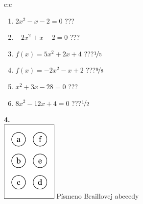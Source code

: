 \documentclass[10pt]{report}
\begin{document}
\begin{tabular}{c:c}
\begin{minipage}[c][104.5mm][t]{0.5\linewidth}
\begin{center}
\begin{minipage}{0.79\linewidth}
\begin{center}
\begin{varwidth}{\linewidth}
\begin{enumerate}
\Large
\item $2x^2-x-2=0$\quad \dotfill\; ???\;\dotfill {}
\item $-2x^2+x-2=0$\quad \dotfill\; ???\;\dotfill {}
\item $f(x)=5x^2+2x+4$\quad \dotfill\; ???\;\dotfill \quad $\nicefrac{1}{5}$
\item $f(x)=-2x^2-x+2$\quad \dotfill\; ???\;\dotfill \quad $\nicefrac{9}{8}$
\item $x^2+3x-28=0$\quad \dotfill\; ???\;\dotfill {}
\item $8x^2-12x+4=0$\quad \dotfill\; ???\;\dotfill \quad $\nicefrac{1}{2}$
\end{enumerate}
\end{varwidth}
\end{center}
\end{minipage}
\begin{minipage}{0.20\linewidth}
\begin{center}
{\Huge\bfseries 4.} \\[2mm]
\includegraphics[height=40mm]{../images/braille.png}
{\small Písmeno Braillovej abecedy}
\end{center}
\end{minipage}
\end{center}
\end{minipage}
%
\end{tabular}
\newpage
\thispagestyle{empty}
\end{document}
